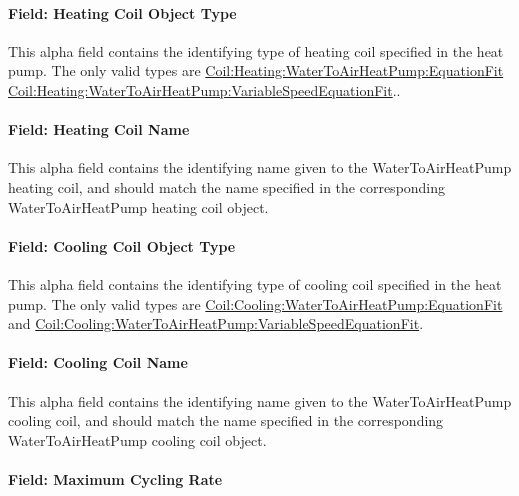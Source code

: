 \paragraph{Field: Heating Coil Object Type}\label{field-heating-coil-object-type-5-000}

This alpha field contains the identifying type of heating coil specified in the heat pump. The only valid types are \hyperref[coilheatingwatertoairheatpumpequationfit]{Coil:Heating:WaterToAirHeatPump:EquationFit} \hyperref[coilheatingwatertoairheatpumpvariablespeedequationfit]{Coil:Heating:WaterToAirHeat\hyperref[pumpvariablespeed]{Pump:VariableSpeed}EquationFit}..

\paragraph{Field: Heating Coil Name}\label{field-heating-coil-name-5-000}

This alpha field contains the identifying name given to the WaterToAirHeatPump heating coil, and should match the name specified in the corresponding WaterToAirHeatPump heating coil object.

\paragraph{Field: Cooling Coil Object Type}\label{field-cooling-coil-object-type-5-000}

This alpha field contains the identifying type of cooling coil specified in the heat pump. The only valid types are \hyperref[coilcoolingwatertoairheatpumpequationfit]{Coil:Cooling:WaterToAirHeatPump:EquationFit} and \hyperref[coilcoolingwatertoairheatpumpvariablespeedequationfit]{Coil:Cooling:WaterToAirHeat\hyperref[pumpvariablespeed]{Pump:VariableSpeed}EquationFit}.

\paragraph{Field: Cooling Coil Name}\label{field-cooling-coil-name-4-000}

This alpha field contains the identifying name given to the WaterToAirHeatPump cooling coil, and should match the name specified in the corresponding WaterToAirHeatPump cooling coil object.

\paragraph{Field: Maximum Cycling Rate}\label{field-maximum-cycling-rate-002}

